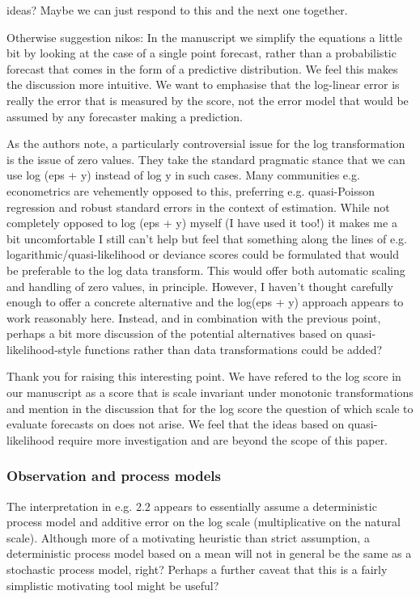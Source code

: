 \documentclass{article}
\newcommand{\red}{\color{red}}
\newcommand{\black}{\color{black}}
\newcommand{\blue}{\color{blue}}
\begin{document}
\black
ideas? Maybe we can just respond to this and the next one together. 

Otherwise suggestion nikos: 
In the manuscript we simplify the equations a little bit by looking at the case of a single point forecast, rather than a probabilistic forecast that comes in the form of a predictive distribution. We feel this makes the discussion more intuitive. We want to emphasise that the log-linear error is really the error that is measured by the score, not the error model that would be assumed by any forecaster making a prediction. 


\blue
As the authors note, a particularly controversial issue for the log transformation is the issue of zero values. They take the standard pragmatic stance that we can use log (eps + y) instead of log y in such cases. Many communities e.g. econometrics are vehemently opposed to this, preferring e.g. quasi-Poisson regression and robust standard errors in the context of estimation. While not completely opposed to log (eps + y) myself (I have used it too!) it makes me a bit uncomfortable I still can’t help but feel that something along the lines of e.g. logarithmic/quasi-likelihood or deviance scores could be formulated that would be preferable to the log data transform. This would offer both automatic scaling and handling of zero values, in principle. However, I haven’t thought carefully enough to offer a concrete alternative and the log(eps + y) approach appears to work reasonably here. Instead, and in combination with the previous point, perhaps a bit more discussion of the potential alternatives based on quasi-likelihood-style functions rather than data transformations could be added?

\black
Thank you for raising this interesting point. We have refered to the log score in our manuscript as a score that is scale invariant under monotonic transformations and mention in the discussion that for the log score the question of which scale to evaluate forecasts on does not arise. We feel that the ideas based on quasi-likelihood require more investigation and are beyond the scope of this paper. 


\red
\subsubsection{Observation and process models}
The interpretation in e.g. 2.2 appears to essentially assume a deterministic process model and additive error on the log scale (multiplicative on the natural scale). Although more of a motivating heuristic than strict assumption, a deterministic process model based on a mean will not in general be the same as a stochastic process model, right? Perhaps a further caveat that this is a fairly simplistic motivating tool might be useful?
\end{document}

